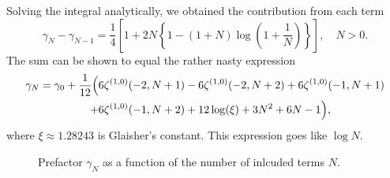 Solving the integral analytically, we obtained the contribution from each term
\[
  \gamma_N - \gamma_{N-1} = \frac{1}{4} \left[
  1 + 2 N \left\{1 - (1+N) \log(1 + \frac{1}{N}) \right\} 
\right], \quad N > 0.
\]
The sum can be shown to equal the rather nasty expression
\begin{equation}
  \begin{split}
  \gamma_N = \gamma_0 + \frac{1}{12} &\Big(
    6 \zeta ^{(1,0)}(-2,N+1)
    -6 \zeta ^{(1,0)}(-2,N+2)
    +6 \zeta^{(1,0)}(-1,N+1)\\
    &\hphantom{\Big(} \mathllap{+} 6 \zeta^{(1,0)}(-1,N+2)
    +12 \log (\xi)
    +3 N^2
    +6 N
    -1
  \Big),
  \end{split}
\end{equation}
where \( \xi \approx  1.28243 \) is Glaisher's constant.
This expression goes like \( \log N \).

\begin{figure}[ht]
  \centering
  \newcommand\datafiles{notilt_contrib2.csv/0.0, notilt_contrib.csv/0.1}
  \newcommand\plottitle{Yupp}  %
  \newcommand\prefix{t_x = }
  
  \caption{Prefactor \( \gamma_N \) as a function of the number of inlcuded terms \( N \).}
\end{figure}



%   


